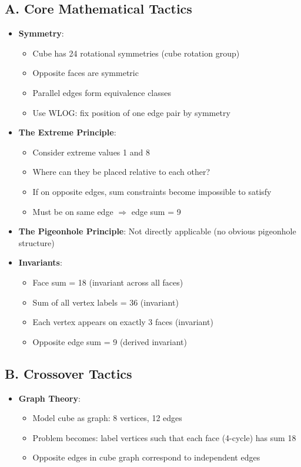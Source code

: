 \documentclass[]{article}
\begin{document}
\begin{tacticalbox}
\subsection*{A. Core Mathematical Tactics}
\begin{itemize}[leftmargin=*]
    \item \textbf{Symmetry}:
    \begin{itemize}
        \item Cube has 24 rotational symmetries (cube rotation group)
        \item Opposite faces are symmetric
        \item Parallel edges form equivalence classes
        \item Use WLOG: fix position of one edge pair by symmetry
    \end{itemize}
    
    \item \textbf{The Extreme Principle}:
    \begin{itemize}
        \item Consider extreme values 1 and 8
        \item Where can they be placed relative to each other?
        \item If on opposite edges, sum constraints become impossible to satisfy
        \item Must be on same edge $\Rightarrow$ edge sum = 9
    \end{itemize}
    
    \item \textbf{The Pigeonhole Principle}: Not directly applicable (no obvious pigeonhole structure)
    
    \item \textbf{Invariants}:
    \begin{itemize}
        \item Face sum = 18 (invariant across all faces)
        \item Sum of all vertex labels = 36 (invariant)
        \item Each vertex appears on exactly 3 faces (invariant)
        \item Opposite edge sum = 9 (derived invariant)
    \end{itemize}
\end{itemize}

\subsection*{B. Crossover Tactics}
\begin{itemize}[leftmargin=*]
    \item \textbf{Graph Theory}:
    \begin{itemize}
        \item Model cube as graph: 8 vertices, 12 edges
        \item Problem becomes: label vertices such that each face (4-cycle) has sum 18
        \item Opposite edges in cube graph correspond to independent edges
    \end{itemize}
    

\end{itemize}
\end{tacticalbox}
\end{document}
